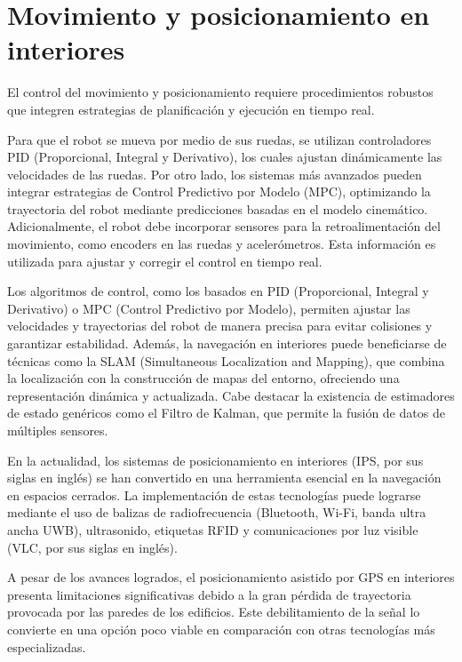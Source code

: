 \section{Movimiento y posicionamiento en interiores}

El control del movimiento y posicionamiento requiere procedimientos robustos que integren estrategias de planificación y ejecución en tiempo real.

Para que el robot se mueva por medio de sus ruedas, se utilizan controladores PID (Proporcional, Integral y Derivativo), los cuales ajustan dinámicamente las velocidades de las ruedas. Por otro lado, los sistemas más avanzados pueden integrar estrategias de Control Predictivo por Modelo (MPC), optimizando la trayectoria del robot mediante predicciones basadas en el modelo cinemático. Adicionalmente, el robot debe incorporar sensores para la retroalimentación del movimiento, como encoders en las ruedas y acelerómetros. Esta información es utilizada para ajustar y corregir el control en tiempo real.

Los algoritmos de control, como los basados en PID (Proporcional, Integral y Derivativo) o MPC (Control Predictivo por Modelo), permiten ajustar las velocidades y trayectorias del robot de manera precisa para evitar colisiones y garantizar estabilidad. Además, la navegación en interiores puede beneficiarse de técnicas como la SLAM (Simultaneous Localization and Mapping), que combina la localización con la construcción de mapas del entorno, ofreciendo una representación dinámica y actualizada. Cabe destacar la existencia de estimadores de estado genéricos como el Filtro de Kalman, que permite la fusión de datos de múltiples sensores.

En la actualidad, los sistemas de posicionamiento en interiores (IPS, por sus siglas en inglés) se han convertido en una herramienta esencial en la navegación en espacios cerrados. La implementación de estas tecnologías puede lograrse mediante el uso de balizas de radiofrecuencia (Bluetooth, Wi-Fi, banda ultra ancha UWB), ultrasonido, etiquetas RFID y comunicaciones por luz visible (VLC, por sus siglas en inglés). \cite{nuaimisurveyindoorpositioning} \cite{mobilerobotsips}

A pesar de los avances logrados, el posicionamiento asistido por GPS en interiores presenta limitaciones significativas debido a la gran pérdida de trayectoria provocada por las paredes de los edificios. Este debilitamiento de la señal lo convierte en una opción poco viable en comparación con otras tecnologías más especializadas. \cite{mobilerobotsips}

